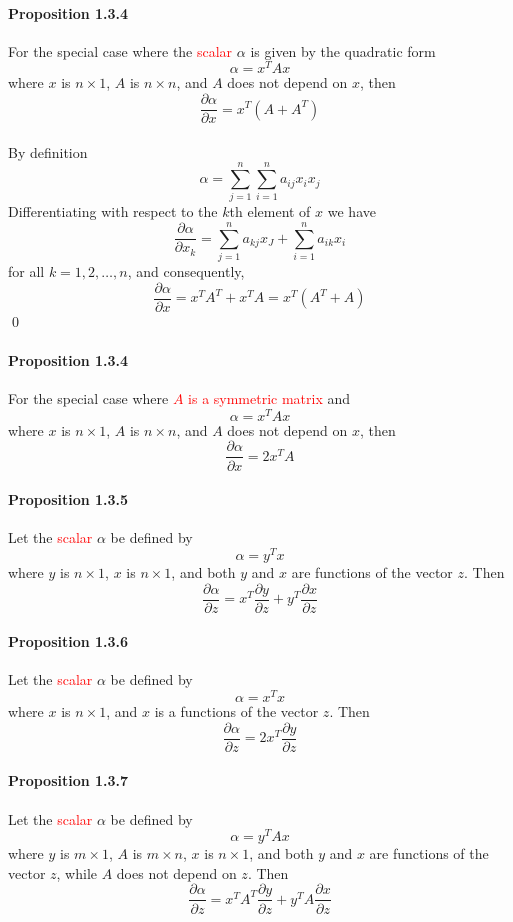 \documentclass[11pt]{article}
\begin{document}
\paragraph{Proposition 1.3.4}
For the special case where the \textcolor{red}{scalar} $\alpha$ is given by the quadratic form
$$\alpha = x^TAx$$
where $x$ is $n \times 1$, $A$ is $n \times n$, and $A$ does not depend on $x$, then
$$\frac{\partial \alpha}{\partial x} = x^T (A + A^T)$$
 \\
By definition
$$\alpha = \sum_{j=1}^n \sum_{i=1}^n a_{ij}x_ix_j$$
Differentiating with respect to the $k$th element of $x$ we have
$$\frac{\partial \alpha}{\partial x_k} = \sum_{j=1}^n a_{kj}x_J + \sum_{i=1}^n a_{ik}x_i$$
for all $k = 1,2, \hdots, n$, and consequently,
$$\frac{\partial \alpha}{\partial x} = x^TA^T + x^TA = x^T(A^T + A)$$ \qed

\paragraph{Proposition 1.3.4}
For the special case where \textcolor{red}{$A$ is a symmetric matrix} and
$$\alpha = x^TAx$$
where $x$ is $n \times 1$, $A$ is $n \times n$, and $A$ does not depend on $x$, then
$$\frac{\partial \alpha}{\partial x} = 2x^TA$$

\paragraph{Proposition 1.3.5}
Let the \textcolor{red}{scalar} $\alpha$ be defined by
$$\alpha = y^Tx$$
where $y$ is $n \times 1$, $x$ is $n \times 1$, and both $y$ and $x$ are functions of the vector $z$. Then
$$\frac{\partial \alpha}{\partial z} = x^T \frac{\partial y}{\partial z} + y^T \frac{\partial x}{\partial z}$$

\paragraph{Proposition 1.3.6}
Let the \textcolor{red}{scalar} $\alpha$ be defined by
$$\alpha = x^Tx$$
where $x$ is $n \times 1$, and $x$ is a functions of the vector $z$. Then
$$\frac{\partial \alpha}{\partial z} = 2x^T \frac{\partial y}{\partial z}$$

\paragraph{Proposition 1.3.7}
Let the \textcolor{red}{scalar} $\alpha$ be defined by
$$\alpha = y^TAx$$
where $y$ is $m \times 1$, $A$ is $m \times n$, $x$ is $n \times 1$, and both $y$ and $x$ are functions of the vector $z$, while $A$ does not depend on $z$. Then
$$\frac{\partial \alpha}{\partial z} = x^T A^T\frac{\partial y}{\partial z} + y^T A\frac{\partial x}{\partial z}$$
\end{document}
